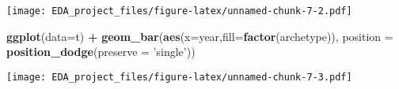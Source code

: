 \documentclass[]{article}
\newenvironment{Shaded}{\begin{snugshade}}{\end{snugshade}}
\newcommand{\KeywordTok}[1]{\textcolor[rgb]{0.13,0.29,0.53}{\textbf{#1}}}
\newcommand{\DataTypeTok}[1]{\textcolor[rgb]{0.13,0.29,0.53}{#1}}
\newcommand{\StringTok}[1]{\textcolor[rgb]{0.31,0.60,0.02}{#1}}
\newcommand{\OperatorTok}[1]{\textcolor[rgb]{0.81,0.36,0.00}{\textbf{#1}}}
\newcommand{\NormalTok}[1]{#1}
\begin{document}
\texttt{[image: EDA\_project\_files/figure-latex/unnamed-chunk-7-2.pdf]}

\begin{Shaded}
\begin{Highlighting}[]
\KeywordTok{ggplot}\NormalTok{(}\DataTypeTok{data=}\NormalTok{t) }\OperatorTok{+}\StringTok{ }\KeywordTok{geom_bar}\NormalTok{(}\KeywordTok{aes}\NormalTok{(}\DataTypeTok{x=}\NormalTok{year,}\DataTypeTok{fill=}\KeywordTok{factor}\NormalTok{(archetype)), }\DataTypeTok{position =} \KeywordTok{position_dodge}\NormalTok{(}\DataTypeTok{preserve =} \StringTok{'single'}\NormalTok{))}
\end{Highlighting}
\end{Shaded}

\texttt{[image: EDA\_project\_files/figure-latex/unnamed-chunk-7-3.pdf]}
\end{document}

